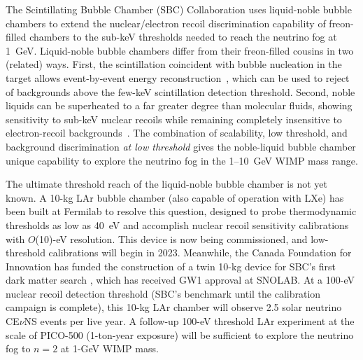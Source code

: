 
The Scintillating Bubble Chamber (SBC) Collaboration uses liquid-noble bubble chambers to extend the nuclear/electron recoil discrimination capability of freon-filled chambers to the sub-keV thresholds needed to reach the neutrino fog at 1~GeV.  Liquid-noble bubble chambers differ from their freon-filled cousins in two (related) ways. First, the scintillation coincident with bubble nucleation in the target allows event-by-event energy reconstruction~\cite{Baxter:2017ozv}, which can be used to reject of backgrounds above the few-keV scintillation detection threshold.  Second, noble liquids can be superheated to a far greater degree than molecular fluids, showing sensitivity to sub-keV nuclear recoils while remaining completely insensitive to electron-recoil backgrounds~\cite{Durnford:2021cvb}.  The combination of scalability, low threshold, and background discrimination \emph{at low threshold} gives the noble-liquid bubble chamber unique capability to explore the neutrino fog in the 1--10~GeV WIMP mass range.

The ultimate threshold reach of the liquid-noble bubble chamber is not yet known.  A 10-kg LAr bubble chamber (also capable of operation with LXe) has been built at Fermilab to resolve this question, designed to probe thermodynamic thresholds as low as 40~eV and accomplish nuclear recoil sensitivity calibrations with $O$(10)-eV resolution.  This device is now being commissioned, and low-threshold calibrations will begin in 2023.  Meanwhile, the Canada Foundation for Innovation has funded the construction of a twin 10-kg device for SBC's first dark matter search \cite{Giampa:2021wte}, which has received GW1 approval at SNOLAB.  At a 100-eV nuclear recoil detection threshold (SBC's benchmark until the calibration campaign is complete), this 10-kg LAr chamber will observe 2.5 solar neutrino CE$\nu$NS events per live year.  A follow-up 100-eV threshold LAr experiment at the scale of PICO-500 (1-ton-year exposure) will be sufficient to explore the neutrino fog to $n=2$ at 1-GeV WIMP mass. 

